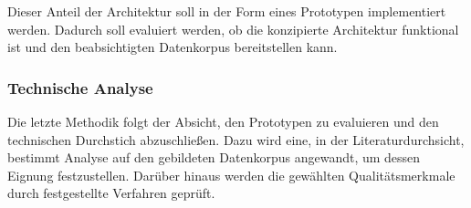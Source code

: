 Dieser Anteil der Architektur soll in der Form eines Prototypen implementiert werden. Dadurch soll evaluiert werden, ob die konzipierte Architektur funktional ist und den beabsichtigten Datenkorpus bereitstellen kann.

\subsubsection{Technische Analyse }
Die letzte Methodik folgt der Absicht, den Prototypen zu evaluieren und den technischen Durchstich abzuschließen. Dazu wird eine, in der Literaturdurchsicht, bestimmt Analyse auf den gebildeten Datenkorpus angewandt, um dessen Eignung festzustellen. 
Darüber hinaus werden die gewählten Qualitätsmerkmale durch festgestellte Verfahren geprüft. 